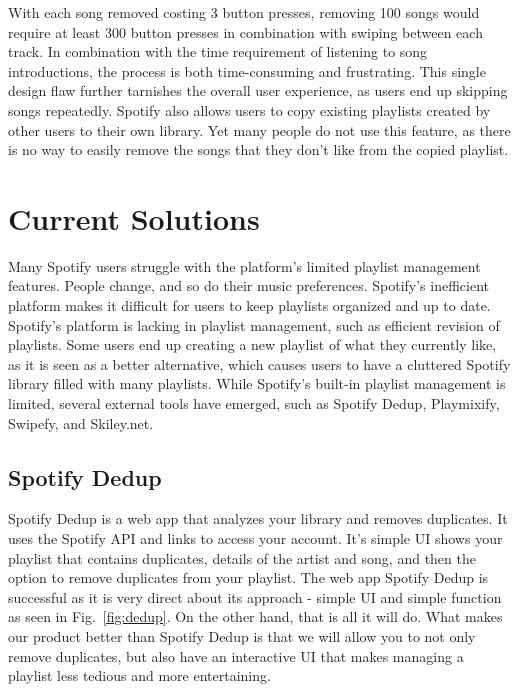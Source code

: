 \documentclass{article}
\begin{document}


With each song removed costing 3 button presses, removing 100 songs would require at least 300 button presses in combination with swiping between each track.  In combination with the time requirement of listening to song introductions, the process is both time-consuming and frustrating.  This single design flaw further tarnishes the overall user experience, as users end up skipping songs repeatedly.  Spotify also allows users to copy existing playlists created by other users to their own library.  Yet many people do not use this feature, as there is no way to easily remove the songs that they don't like from the copied playlist.\\

\section{Current Solutions}
Many Spotify users struggle with the platform's limited playlist management features. People change, and so do their music preferences. Spotify's inefficient platform makes it difficult for users to keep playlists organized and up to date.\\

Spotify's platform is lacking in playlist management, such as efficient revision of playlists. Some users end up creating a new playlist of what they currently like, as it is seen as a better alternative, which causes users to have a cluttered Spotify library filled with many playlists. While Spotify's built-in playlist management is limited, several external tools have emerged, such as Spotify Dedup, Playmixify, Swipefy, and Skiley.net.

\subsection{Spotify Dedup}
\quad Spotify Dedup is a web app that analyzes your library and removes duplicates. It uses the Spotify API and links to access your account. It's simple UI shows your playlist that contains duplicates, details of the artist and song, and then the option to remove duplicates from your playlist. \cite{Spotify_dedup} The web app Spotify Dedup is successful as it is very direct about its approach - simple UI and simple function as seen in Fig.~\ref{fig:dedup}. On the other hand, that is all it will do. What makes our product better than Spotify Dedup is that we will allow you to not only remove duplicates, but also have an interactive UI that makes managing a playlist less tedious and more entertaining. 
\end{document}
